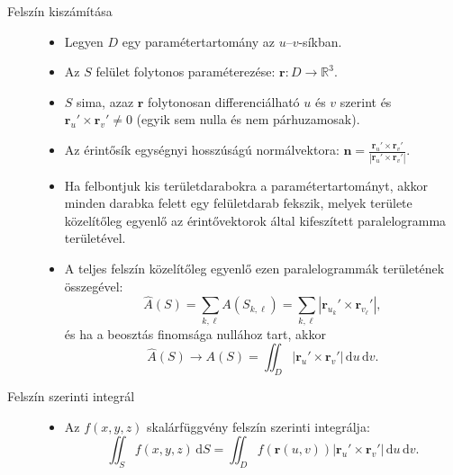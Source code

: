 \documentclass[%
	DIV=15,appendixprefix]{scrreprt}
\theoremstyle{definition}
\theoremstyle{remark}
\begin{document}
\begin{description}
	\item[Felszín kiszámítása]\leavevmode
		\begin{itemize}
			\item Legyen $ D $ egy paramétertartomány az $ u $--$ v $-síkban.
			\item Az $ S $ felület folytonos paraméterezése: $ \mathbf{ r } \colon D \rightarrow
			 	\mathbb{ R }^{ 3 }$.
			\item $ S $ sima, azaz $ \mathbf{ r } $ folytonosan differenciálható $ u$  és $ v $
				szerint és $ \mathbf{ r }_{ u }' \times \mathbf{r}_{ v }' \neq 0 $ (egyik sem nulla
				és nem párhuzamosak).
			\item Az érintősík egységnyi hosszúságú normálvektora: $ \mathbf{ n } =
				\frac{ \mathbf{ r }_{ u }' \times \mathbf{ r }_{ v }' }{ \left| \mathbf{ r }_{ u }'
				\times \mathbf{ r }_{ v }' \right|}$.
			\item Ha felbontjuk kis területdarabokra a paramétertartományt, akkor minden darabka
				felett egy felületdarab fekszik, melyek területe közelítőleg egyenlő az
				érintővektorok által kifeszített paralelogramma területével.
			\item A teljes felszín közelítőleg egyenlő ezen paralelogrammák területének összegével:
				\begin{equation*}
					\hat{ A } \left( S \right) = \sum_{ k,{} \ell} A \left( S_{ k,{} \ell } \right)
					= \sum_{ k,{} \ell} \left| \mathbf{r}_{ u_{ k } }' \times
					\mathbf{r}_{ v_{ \ell } }'\right|,
				\end{equation*}
				és ha a beosztás finomsága nullához tart, akkor
				\begin{equation*}
					\hat{ A } \left( S \right) \rightarrow A \left( S \right) = \iint_{ D } \left|
					\mathbf{r}_{ u }' \times \mathbf{r}_{ v }'\right| \, \mathrm{ d } u \,
					\mathrm{ d } v.
				\end{equation*}
		\end{itemize}
	\item[Felszín szerinti integrál]\leavevmode
		\begin{itemize}
			\item Az $ f \left( x,{} y,{} z \right) $ skalárfüggvény felszín szerinti integrálja:
				\begin{equation*}
					\iint_{ S } f \left( x,{} y,{} z \right) \, \mathrm{ d } S = \iint_{ D } f
					\left( \mathbf{ r } \left( u,{} v \right) \right) \left| \mathbf{r}_{ u }'
					\times \mathbf{r}_{ v }'\right| \, \mathrm{ d } u \, \mathrm{ d } v.

\end{equation*}
\end{itemize}
\end{description}
\end{document}
